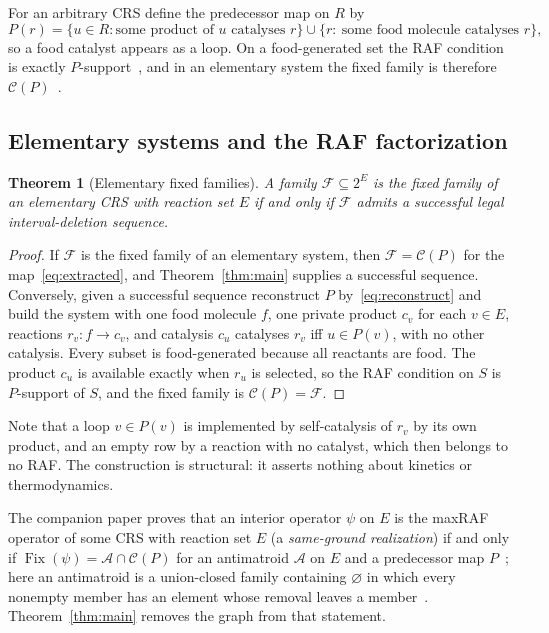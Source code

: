 \documentclass[11pt,a4paper]{article}
\theoremstyle{plain}
\newtheorem{theorem}{Theorem}[section]
\theoremstyle{definition}
\theoremstyle{remark}
\newcommand{\cA}{\mathcal A}
\newcommand{\cC}{\mathcal C}
\newcommand{\cF}{\mathcal F}
\newcommand{\Fix}{\operatorname{Fix}}
\newcommand{\pw}[1]{2^{#1}}
\begin{document}
For an arbitrary CRS define the predecessor map on $R$ by
\begin{equation}\label{eq:extracted}
 P(r)=\{u\in R: \text{some product of }u\text{ catalyses }r\}\cup\{r:\ \text{some food molecule catalyses }r\},
\end{equation}
so a food catalyst appears as a loop. On a food-generated set the RAF condition is exactly $P$-support~\cite[Section~3.2]{steel2023interior}, and in an elementary system the fixed family is therefore $\cC(P)$~\cite{companion2026antimatroid}.

\subsection{Elementary systems and the RAF factorization}

\begin{theorem}[Elementary fixed families]\label{thm:elementary}
A family $\cF\subseteq\pw{E}$ is the fixed family of an elementary CRS with reaction set $E$ if and only if $\cF$ admits a successful legal interval-deletion sequence.
\end{theorem}

\begin{proof}
If $\cF$ is the fixed family of an elementary system, then $\cF=\cC(P)$ for the map~\eqref{eq:extracted}, and Theorem~\ref{thm:main} supplies a successful sequence. Conversely, given a successful sequence reconstruct $P$ by~\eqref{eq:reconstruct} and build the system with one food molecule $f$, one private product $c_v$ for each $v\in E$, reactions $r_v: f\to c_v$, and catalysis $c_u$ catalyses $r_v$ iff $u\in P(v)$, with no other catalysis. Every subset is food-generated because all reactants are food. The product $c_u$ is available exactly when $r_u$ is selected, so the RAF condition on $S$ is $P$-support of $S$, and the fixed family is $\cC(P)=\cF$.
\end{proof}

Note that a loop $v\in P(v)$ is implemented by self-catalysis of $r_v$ by its own product, and an empty row by a reaction with no catalyst, which then belongs to no RAF. The construction is structural: it asserts nothing about kinetics or thermodynamics.

The companion paper proves that an interior operator $\psi$ on $E$ is the maxRAF operator of some CRS with reaction set $E$ (a \emph{same-ground realization}) if and only if $\Fix(\psi)=\cA\cap\cC(P)$ for an antimatroid $\cA$ on $E$ and a predecessor map $P$~\cite{companion2026antimatroid}; here an antimatroid is a union-closed family containing $\varnothing$ in which every nonempty member has an element whose removal leaves a member~\cite{korte1991greedoids}. Theorem~\ref{thm:main} removes the graph from that statement.
\end{document}
